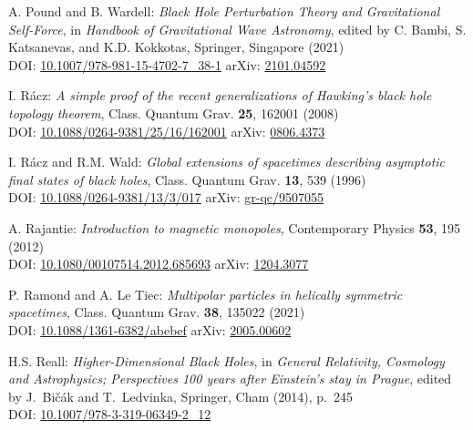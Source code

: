 \begin{thebibliography}{123}
A. Pound and B. Wardell:
{\em Black Hole Perturbation Theory and Gravitational Self-Force},
in {\em Handbook of Gravitational Wave Astronomy}, edited by
C. Bambi, S. Katsanevas, and K.D. Kokkotas,
Springer, Singapore (2021)\\
DOI: \href{https://doi.org/10.1007/978-981-15-4702-7_38-1}{10.1007/978-981-15-4702-7\_38-1}\hfill
arXiv: \href{https://arxiv.org/abs/2101.04592}{2101.04592}

I. R\'acz:
{\em A simple proof of the recent generalizations of Hawking's black hole topology theorem},
Class. Quantum Grav. {\bf 25}, 162001 (2008)\\
DOI: \href{https://doi.org/10.1088/0264-9381/25/16/162001}{10.1088/0264-9381/25/16/162001}\hfill
arXiv: \href{https://arxiv.org/abs/0806.4373}{0806.4373}

I. R\'acz and R.M. Wald:
{\em Global extensions of spacetimes describing asymptotic final states of black holes},
Class. Quantum Grav. {\bf 13}, 539 (1996)\\
DOI: \href{https://doi.org/10.1088/0264-9381/13/3/017}{10.1088/0264-9381/13/3/017}\hfill
arXiv: \href{https://arxiv.org/abs/gr-qc/9507055}{gr-qc/9507055}

A. Rajantie:
{\em Introduction to magnetic monopoles},
Contemporary Physics {\bf 53}, 195 (2012)\\
DOI: \href{https://doi.org/10.1080/00107514.2012.685693}{10.1080/00107514.2012.685693}\hfill
arXiv: \href{https://arxiv.org/abs/1204.3077}{1204.3077}

P. Ramond and A. Le Tiec:
{\em Multipolar particles in helically symmetric spacetimes},
Class. Quantum Grav. {\bf 38}, 135022 (2021)\\
DOI: \href{https://doi.org/10.1088/1361-6382/abebef}{10.1088/1361-6382/abebef}\hfill
arXiv: \href{https://arxiv.org/abs/2005.00602}{2005.00602}

H.S. Reall:
{\em Higher-Dimensional Black Holes},
in {\em  General Relativity, Cosmology and Astrophysics; Perspectives 100 years after Einstein's stay in Prague}, edited by J.~Bičák and T.~Ledvinka,
Springer, Cham (2014), p.~245\\
DOI: \href{https://doi.org/10.1007/978-3-319-06349-2_12}{10.1007/978-3-319-06349-2\_12}


\end{thebibliography}
